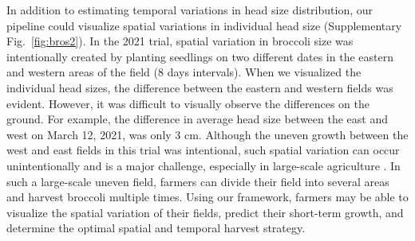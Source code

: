 In addition to estimating temporal variations in head size distribution, our pipeline could visualize spatial variations in individual head size (Supplementary Fig.~\ref{fig:bros2}). In the 2021 trial, spatial variation in broccoli size was intentionally created by planting seedlings on two different dates in the eastern and western areas of the field (8 days intervals). When we visualized the individual head sizes, the difference between the eastern and western fields was evident. However, it was difficult to visually observe the differences on the ground. For example, the difference in average head size between the east and west on March 12, 2021, was only 3 cm. Although the uneven growth between the west and east fields in this trial was intentional, such spatial variation can occur unintentionally and is a major challenge, especially in large-scale agriculture \citep{quine_investigation_2002}. In such a large-scale uneven field, farmers can divide their field into several areas and harvest broccoli multiple times. Using our framework, farmers may be able to visualize the spatial variation of their fields, predict their short-term growth, and determine the optimal spatial and temporal harvest strategy.

